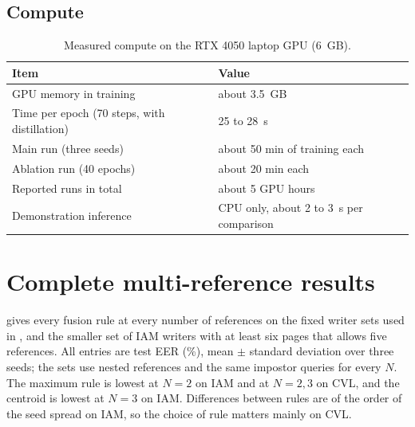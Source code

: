 \subsection{Compute}
\begin{table}[t]
\caption{Measured compute on the RTX 4050 laptop GPU (6~GB).}
\label{tab:compute}
\centering\scriptsize
\begin{tabular}{ll}
\toprule
Item & Value \\
\midrule
GPU memory in training & about 3.5~GB \\
Time per epoch (70 steps, with distillation) & 25 to 28~s \\
Main run (three seeds) & about 50 min of training each \\
Ablation run (40 epochs) & about 20 min each \\
Reported runs in total & about 5 GPU hours \\
Demonstration inference & CPU only, about 2 to 3~s per comparison \\
\bottomrule
\end{tabular}
\end{table}

\section{Complete multi-reference results}
\label{app:multiref}
 gives every fusion rule at every number of references on the fixed writer sets used in , and  the smaller set of IAM writers with at least six pages that allows five references.
All entries are test EER (\%), mean $\pm$ standard deviation over three seeds; the sets use nested references and the same impostor queries for every $N$.
The maximum rule is lowest at $N=2$ on IAM and at $N=2,3$ on CVL, and the centroid is lowest at $N=3$ on IAM.
Differences between rules are of the order of the seed spread on IAM, so the choice of rule matters mainly on CVL.

\begin{table}[t]
\caption{Test EER (\%) for every fusion rule and number of references, on one fixed writer set per corpus.}
\label{tab:mrfull}
\centering\scriptsize
\setlength{\tabcolsep}{3pt}
\resizebox{\columnwidth}{!}{}
\end{table}

\begin{table}[t]
\caption{Test EER (\%) on the 17 IAM writers with at least six pages, which allows $N=5$.}
\label{tab:mrn5}
\centering\scriptsize
\setlength{\tabcolsep}{3pt}
\resizebox{\columnwidth}{!}{}
\end{table}

